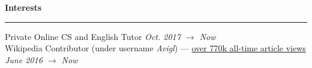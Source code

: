 \documentclass[10pt]{article}
\begin{document}
\begin{flushleft}
		\vspace{1.25mm}
		{\large \raggedright \textbf{Interests}}
		\vspace{1.25mm}
	
		\hrule
	
		\vspace{2.25mm}
		Private Online CS and English Tutor \hfill \textit{\small Oct. 2017 $\rightarrow$ Now}\\
		Wikipedia Contributor (under username \textit{Avigl}) --- \href{https://pageviews.toolforge.org/?project=en.wikipedia.org&platform=all-access&agent=user&redirects=0&range=all-time&pages=Timeline_of_social_media|Timeline_of_online_advertising|Timeline_of_e-commerce|Screening_Partnership_Program|Silicon_Valley_Education_Foundation|Chicago_Community_Trust}{over 770k all-time article views} \hfill \textit{\small June 2016 $\rightarrow$ Now}
	
	\end{flushleft}
\end{document}
